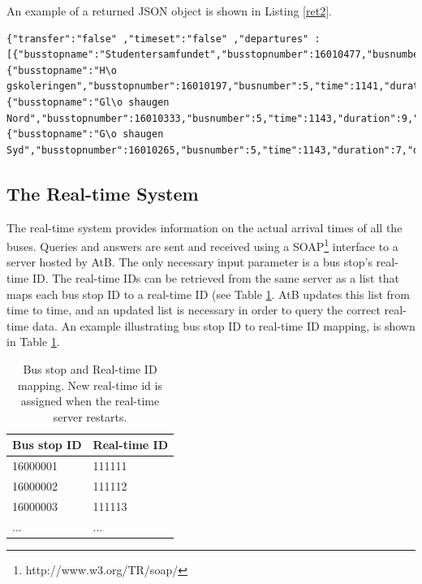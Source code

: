 An example of a returned JSON object is shown in Listing \ref{ret2}.
\medskip
\begin{lstlisting}[caption={BusTUC result with new syntax}, label=ret2]
{"transfer":"false" ,"timeset":"false" ,"departures" : [{"busstopname":"Studentersamfundet","busstopnumber":16010477,"busnumber":5,"time":1139,"duration":11,"destination":"Dragvoll"},{"busstopname":"H\o gskoleringen","busstopnumber":16010197,"busnumber":5,"time":1141,"duration":11,"destination":"Dragvoll"},{"busstopname":"Gl\o shaugen Nord","busstopnumber":16010333,"busnumber":5,"time":1143,"duration":9,"destination":"Dragvoll"},{"busstopname":"G\o shaugen Syd","busstopnumber":16010265,"busnumber":5,"time":1143,"duration":7,"destination":"Dragvoll"}]}
\end{lstlisting}

\subsection{The Real-time System}
The real-time system provides information on the actual arrival times of all the buses. Queries and answers are sent and received using a SOAP\footnote{http://www.w3.org/TR/soap/} interface to a server hosted by AtB. The only necessary input parameter is a bus stop's real-time ID. The real-time IDs can be retrieved from the same server as a list that maps each bus stop ID to a real-time ID (see Table \ref{tab:realtimeid}. AtB updates this list from time to time, and an updated list is necessary in order to query the correct real-time data. An example illustrating bus stop ID to real-time ID mapping, is shown in Table \ref{tab:realtimeid}.

\begin{table}
\begin{center}
\caption{Bus stop and Real-time ID mapping. New real-time id is assigned when the real-time server restarts.}
\label{tab:realtimeid}
    \begin{tabular}{ |  l  |  l  |}
    \hline
    Bus stop ID & Real-time ID\\ \hline
  16000001 & 111111\\ \hline
   16000002 & 111112 \\ \hline
   16000003 & 111113 \\ \hline
    ... & ...	\\
    \hline
    \end{tabular}
\end{center}
\end{table}

